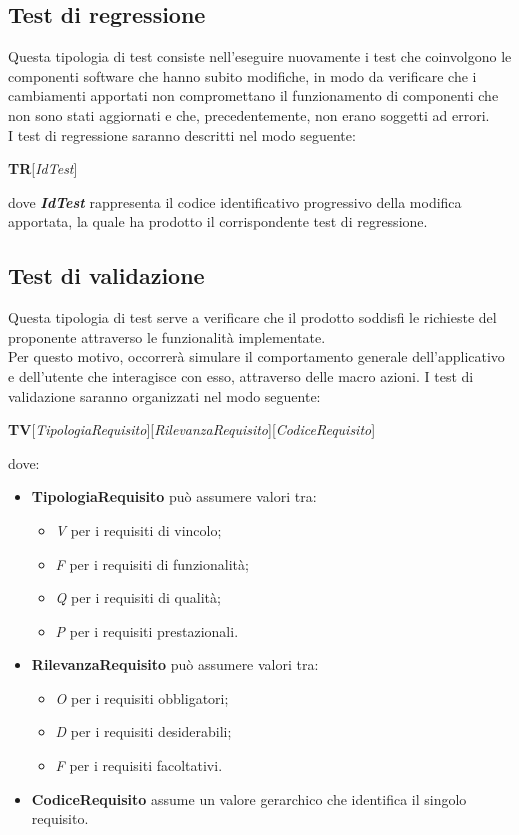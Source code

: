 	\subsection{Test di regressione}
	Questa tipologia di test consiste nell'eseguire nuovamente i test che coinvolgono le componenti software che hanno subito modifiche, in modo da verificare che i cambiamenti apportati non compromettano il funzionamento di componenti che non sono stati aggiornati e che, precedentemente, non erano soggetti ad errori.\\
	I test di regressione saranno descritti nel modo seguente:
	\begin{center}
		\textbf{TR}[\textit{IdTest}]
	\end{center}
	dove \textbf{\textit{IdTest}} rappresenta il codice identificativo progressivo della modifica apportata, la quale ha prodotto il corrispondente test di regressione.
	
	\subsection{Test di validazione}
	Questa tipologia di test serve a verificare che il prodotto soddisfi le richieste del proponente attraverso le funzionalità implementate.\\
	Per questo motivo, occorrerà simulare il comportamento generale dell'applicativo e dell'utente che interagisce con esso, attraverso delle macro azioni.
	I test di validazione saranno organizzati nel modo seguente:
	\begin{center}
		\textbf{TV}[\textit{TipologiaRequisito}][\textit{RilevanzaRequisito}][\textit{CodiceRequisito}]
	\end{center}
	dove:
	\begin{itemize}
		\item
		\textbf{TipologiaRequisito} può assumere valori tra:
		\begin{itemize}
			\item
			\textit{V} per i requisiti di vincolo;
			\item
			\textit{F} per i requisiti di funzionalità;
			\item
			\textit{Q} per i requisiti di qualità;
			\item
			\textit{P} per i requisiti prestazionali.
		\end{itemize}
		\item 
		\textbf{RilevanzaRequisito} può assumere valori tra:
		\begin{itemize}
			\item
			\textit{O} per i requisiti obbligatori;
			\item
			\textit{D} per i requisiti desiderabili;
			\item
			\textit{F} per i requisiti facoltativi.
		\end{itemize}
		\item
		\textbf{CodiceRequisito} assume un valore gerarchico che identifica il singolo requisito.
	\end{itemize}

